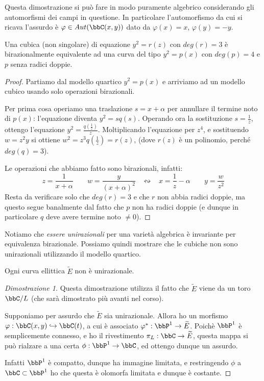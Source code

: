 \begin{osservazione}
Questa dimostrazione si può fare in modo puramente algebrico considerando gli automorfismi dei campi in questione. In particolare l'automorfismo da cui si ricava l'assurdo è $\varphi\in Aut(\bbC(x,y))$ dato da $\varphi(x)=x$, $\varphi(y)=-y$.
\end{osservazione}
\begin{lemma}
Una cubica (non singolare) di equazione $y^2=r(z)$ con $deg(r)=3$ è birazionalmente equivalente ad una curva del tipo $y^2=p(x)$ con $deg(p)=4$ e $p$ senza radici doppie.
\end{lemma}
\begin{proof}
Partiamo dal modello quartico $y^2=p(x)$ e arriviamo ad un modello cubico usando solo operazioni birazionali.

Per prima cosa operiamo una traslazione $s=x+\alpha$ per annullare il termine noto di $p(x)$: l'equazione diventa $y^2=sq(s)$.
Operando ora la sostituzione $s=\frac{1}{z}$, ottengo l'equazione $y^2=\frac{q(\frac{1}{z})}{z}$. Moltiplicando l'equazione per $z^4$, e sostituendo $w=z^2y$ si ottiene $w^2=z^3q(\frac{1}{z})=r(z)$, (dove $r(z)$ è un polinomio, perché $deg(q)=3$).

Le operazioni che abbiamo fatto sono birazionali, infatti:
$$z=\frac{1}{x+\alpha}  \;\;\;\;\;\;\;   w=\frac{y}{(x+\alpha)^2}  \;\;\;\leftrightsquigarrow\;\;\;  x=\frac{1}{z}-\alpha   \;\;\;\;\;\;\;  y=\frac{w}{z^2}$$
Resta da verificare solo che $deg(r)=3$ e che $r$ non abbia radici doppie, ma questo segue banalmente dal fatto che $p$ non ha radici doppie (e dunque in particolare $q$ deve avere termine noto $\neq 0$).
\end{proof}

Notiamo che {\it essere unirazionali} per una varietà algebrica è invariante per equivalenza birazionale. Possiamo quindi mostrare che le cubiche non sono unirazionali utilizzando il modello quartico.

\begin{teorema}
Ogni curva ellittica $\widetilde{E}$ non è unirazionale.
\end{teorema}

\begin{proof}[Dimostrazione 1]
Questa dimostrazione utilizza il fatto che $\widetilde{E}$ viene da un toro $\bbC/L$ (che sarà dimostrato più avanti nel corso).

Supponiamo per assurdo che $\widetilde{E}$ sia unirazionale. Allora ho un morfismo $\varphi: \bbC(x,y)\hookrightarrow\bbC(t)$, a cui è associato $\varphi^*:\bbP^1\rightarrow\widetilde{E}$. Poichè $\bbP^1$ è semplicemente connesso, e ho il rivestimento $\pi_L:\bbC\rightarrow\widetilde{E}$, questa mappa si può rialzare a una certa $\phi:\bbP^1\rightarrow\bbC$, ed ottengo dunque un assurdo.

Infatti $\bbP^1$ è compatto, dunque ha immagine limitata, e restringendo $\phi$ a $\bbC\subset\bbP^1$ ho che questa è olomorfa limitata e dunque è costante.
\end{proof}

